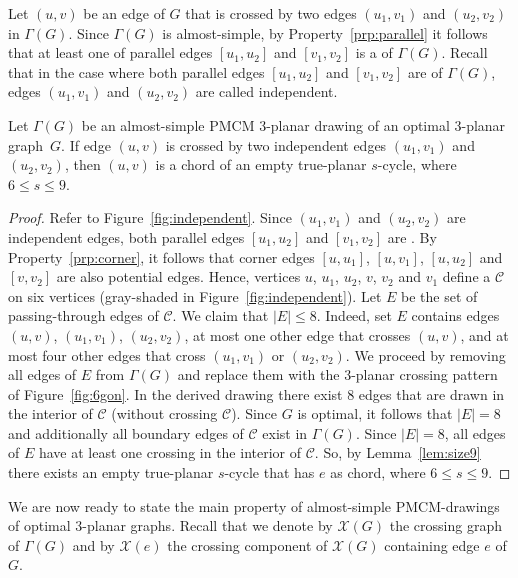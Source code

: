 Let $(u,v)$ be an edge of $G$ that is crossed by two edges $(u_1,v_1)$ and $(u_2,v_2)$ in $\Gamma(G)$. Since $\Gamma(G)$ is almost-simple, by Property~\ref{prp:parallel} it follows that at least one of parallel edges $[u_1,u_2]$ and $[v_1,v_2]$ is a \pe of $\Gamma(G)$. Recall that in the case where both parallel edges $[u_1,u_2]$ and $[v_1,v_2]$ are \pes of $\Gamma(G)$, edges $(u_1,v_1)$ and $(u_2,v_2)$ are called independent.

\begin{lemma}\label{lem:3_planar_independent}
Let $\Gamma(G)$ be an almost-simple PMCM $3$-planar drawing of an optimal $3$-planar graph~$G$. If edge $(u,v)$ is crossed by two independent edges $(u_1,v_1)$ and $(u_2,v_2)$, then $(u,v)$ is a chord of an empty true-planar $s$-cycle, where $6\leq s\leq 9$.
\end{lemma}
\begin{proof}
Refer to Figure~\ref{fig:independent}. Since $(u_1,v_1)$ and $(u_2,v_2)$ are independent edges, both parallel edges $[u_1,u_2]$ and $[v_1,v_2]$ are \pes. By Property~\ref{prp:corner}, it follows that corner edges $[u, u_1]$, $[u,v_1]$, $[u,u_2]$ and $[v,v_2]$ are also potential edges. Hence, vertices $u$, $u_1$, $u_2$, $v$, $v_2$ and $v_1$ define a \pp $\mathcal{C}$ on six vertices (gray-shaded in Figure~\ref{fig:independent}). Let $E$ be the set of passing-through edges of $\mathcal{C}$. We claim that $|E|\leq 8$. Indeed, set $E$ contains edges $(u,v)$, $(u_1,v_1)$, $(u_2,v_2)$, at most one other edge that crosses $(u,v)$, and at most four other edges that cross $(u_1,v_1)$ or $(u_2,v_2)$. We proceed by removing all edges of $E$ from $\Gamma(G)$ and replace them with the $3$-planar crossing pattern of Figure~\ref{fig:6gon}. In the derived drawing there exist $8$ edges that are drawn in the interior of $\mathcal{C}$ (without crossing $\mathcal{C}$). Since $G$ is optimal, it follows that $|E|=8$ and additionally all boundary edges of $\mathcal{C}$ exist in $\Gamma(G)$. Since $|E|=8$, all edges of $E$ have at least one crossing in the interior of $\mathcal{C}$. So, by Lemma~\ref{lem:size9} there exists an empty true-planar $s$-cycle that has $e$ as chord, where $6\leq s\leq 9$.
\end{proof}

We are now ready to state the main property of almost-simple PMCM-drawings of optimal $3$-planar graphs. Recall that we denote by $\mathcal{X}(G)$ the crossing graph of $\Gamma(G)$ and by $\mathcal{X}(e)$ the crossing component of $\mathcal{X}(G)$ containing edge $e$ of $G$.

